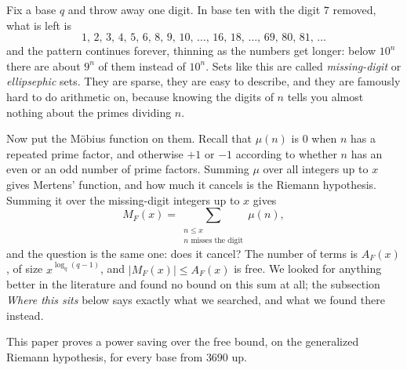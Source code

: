 \documentclass[11pt]{amsart}
\theoremstyle{definition}
\theoremstyle{remark}
\begin{document}
Fix a base $q$ and throw away one digit. In base ten with the digit $7$ removed, what is left is
\[
  1,\,2,\,3,\,4,\,5,\,6,\,8,\,9,\,10,\,\dots,\,16,\,18,\,\dots,\,69,\,80,\,81,\,\dots
\]
and the pattern continues forever, thinning as the numbers get longer: below $10^n$ there are about $9^n$ of them instead of $10^n$. Sets like this are called \emph{missing-digit} or \emph{ellipsephic} sets. They are sparse, they are easy to describe, and they are famously hard to do arithmetic on, because knowing the digits of $n$ tells you almost nothing about the primes dividing $n$.

Now put the M\"obius function on them. Recall that $\mu(n)$ is $0$ when $n$ has a repeated prime factor, and otherwise $+1$ or $-1$ according to whether $n$ has an even or an odd number of prime factors. Summing $\mu$ over all integers up to $x$ gives Mertens' function, and how much it cancels is the Riemann hypothesis. Summing it over the missing-digit integers up to $x$ gives
\[
  M_F(x) = \sum_{\substack{n \le x \\ n \text{ misses the digit}}} \mu(n),
\]
and the question is the same one: does it cancel? The number of terms is $A_F(x)$, of size $x^{\log_q(q-1)}$, and $|M_F(x)| \le A_F(x)$ is free. We looked for anything better in the literature and found no bound on this sum at all; the subsection \emph{Where this sits} below says exactly what we searched, and what we found there instead.

This paper proves a power saving over the free bound, on the generalized Riemann hypothesis, for every base from $3690$ up.
\end{document}
